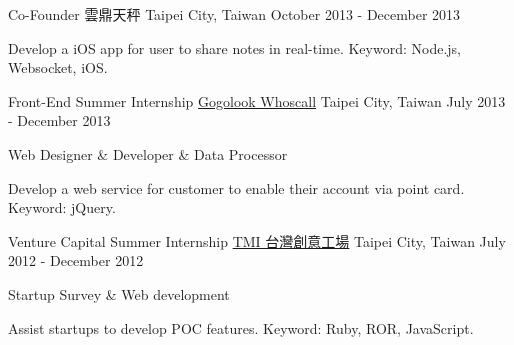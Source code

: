 \begin{cventries}
  \cventry
    {Co-Founder} %
    {雲鼎天秤} %
    {Taipei City, Taiwan} %
    {October 2013 - December 2013} %
    {
      \begin{cvitems} %
        \item {Develop a iOS app for user to share notes in real-time. Keyword: Node.js, Websocket, iOS.}
      \end{cvitems}
    }

  \cventry
    {Front-End Summer Internship} %
    {\href{https://whoscall.com}{Gogolook Whoscall}} %
    {Taipei City, Taiwan} %
    {July 2013 - December 2013} %
    {
      \begin{cvitems} %
        \item {Web Designer \& Developer \& Data Processor}
        \item {Develop a web service for customer to enable their account via point card. Keyword: jQuery.}
        \end{cvitems}
    }

  \cventry
    {Venture Capital Summer Internship} %
    {\href{http://tmi.vc}{TMI 台灣創意工場}} %
    {Taipei City, Taiwan} %
    {July 2012 - December 2012} %
    {
      \begin{cvitems} %
        \item {Startup Survey \& Web development}
        \item {Assist startups to develop POC features. Keyword: Ruby, ROR, JavaScript.}
      \end{cvitems}
    }

\end{cventries}
